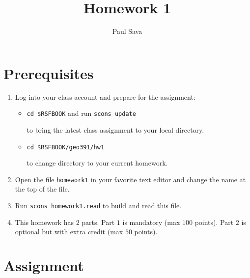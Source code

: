 \author{Paul Sava}
\title{Homework 1}




\section{Prerequisites}

\begin{enumerate}
\item Log into your class account and prepare for the assignment:

\begin{itemize}
\item \texttt{cd \$RSFBOOK} and run \texttt{scons update} \par
to bring the latest class assignment to your local directory.
\item \texttt{cd \$RSFBOOK/geo391/hw1} \par
to change directory to your current homework.
\end{itemize}

\item Open the file \texttt{homework1} in your favorite text editor
and change the name at the top of the file.

\item Run \texttt{scons homework1.read} to build and 
read this file.

\item This homework has $2$ parts. 
Part $1$ is mandatory (max $100$ points).
Part $2$ is optional but with extra credit (max $50$ points).

\end{enumerate}


\section{Assignment}

